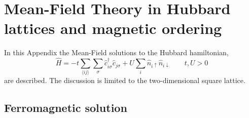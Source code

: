 \chapter{Mean-Field Theory in Hubbard lattices and magnetic ordering}\label{appendix:mean-field-hubbard}

In this Appendix the Mean-Field solutions to the Hubbard hamiltonian,
\[
	\hat H = 
	-t \sum_{\langle ij \rangle} \sum_\sigma \hat c_{i\sigma}^\dagger \hat c_{j\sigma}
	+ U \sum_i \hat n_{i\uparrow} \hat n_{i\downarrow}
	\qquad
	t, U  > 0
\]
are described. The discussion is limited to the two-dimensional square lattice.

\section{Ferromagnetic solution}

